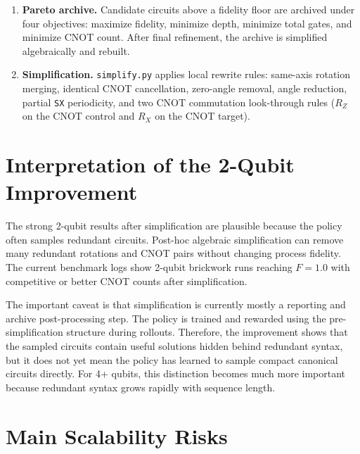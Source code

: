 \documentclass[11pt]{article}
\begin{document}
\begin{enumerate}[leftmargin=*]
  \item \textbf{Pareto archive.}  Candidate circuits above a fidelity floor are
  archived under four objectives: maximize fidelity, minimize depth, minimize
  total gates, and minimize CNOT count.  After final refinement, the archive is
  simplified algebraically and rebuilt.

  \item \textbf{Simplification.}  \texttt{simplify.py} applies local rewrite
  rules: same-axis rotation merging, identical CNOT cancellation, zero-angle
  removal, angle reduction, partial \texttt{SX} periodicity, and two CNOT
  commutation look-through rules (\(R_Z\) on the CNOT control and \(R_X\) on the
  CNOT target).
\end{enumerate}

\section{Interpretation of the 2-Qubit Improvement}

The strong 2-qubit results after simplification are plausible because the policy
often samples redundant circuits.  Post-hoc algebraic simplification can remove
many redundant rotations and CNOT pairs without changing process fidelity.  The
current benchmark logs show 2-qubit brickwork runs reaching \(F=1.0\) with
competitive or better CNOT counts after simplification.

The important caveat is that simplification is currently mostly a reporting and
archive post-processing step.  The policy is trained and rewarded using the
pre-simplification structure during rollouts.  Therefore, the improvement shows
that the sampled circuits contain useful solutions hidden behind redundant
syntax, but it does not yet mean the policy has learned to sample compact
canonical circuits directly.  For 4+ qubits, this distinction becomes much more
important because redundant syntax grows rapidly with sequence length.

\section{Main Scalability Risks}
\end{document}
